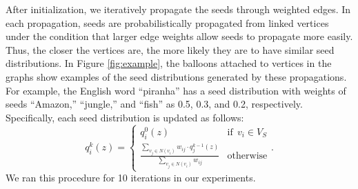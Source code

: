 \documentclass[english]{jnlp_1.4}
\begin{document}
After initialization, we iteratively propagate the seeds through weighted edges. 
In each propagation, seeds are probabilistically propagated from linked vertices under the condition that larger edge weights allow seeds to propagate more easily. 
Thus, the closer the vertices are, the more likely they are to have similar seed distributions. 
In Figure \ref{fig:example}, the balloons attached to vertices in the graphs show examples of the seed distributions generated by these propagations. 
For example, the English word ``piranha'' has a seed distribution with weights of seeds ``Amazon,'' ``jungle,'' and ``fish'' as 0.5, 0.3, and 0.2, respectively. 
Specifically, each seed distribution is updated as follows: 
\begin{equation}
q_{i}^{k}(z)= \left \{
\begin{array}{ll}
q_{i}^{0}(z) & \text{if}~~ v_{i} \in V_{S} \\
\displaystyle \frac{\sum_{v_{j} \in N(v_{i})} w_{ij} \cdot q_{j}^{k-1}(z)}{\sum_{v_{j} \in N(v_{i})} w_{ij}} & \text{otherwise}
\end{array}
\right..
\end{equation}
We ran this procedure for 10 iterations in our experiments. 
\end{document}
